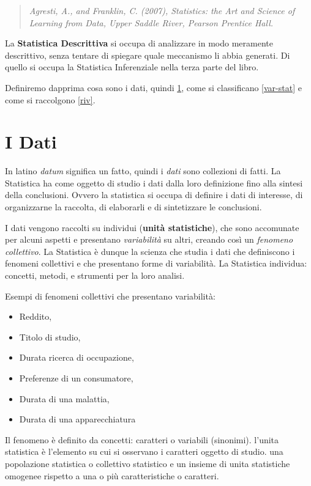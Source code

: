 \documentclass[
  11pt,
]{book}
\providecommand{\tightlist}{%
  \setlength{\itemsep}{0pt}\setlength{\parskip}{0pt}}
\theoremstyle{mytheoremstyle}
\theoremstyle{mydefstyle}
\begin{document}
\begin{quote}
\emph{Agresti, A., and Franklin, C. (2007), Statistics: the Art and Science of Learning from Data, Upper Saddle River, Pearson Prentice Hall.}
\end{quote}

La \textbf{Statistica Descrittiva} si occupa di analizzare in modo meramente descrittivo, senza tentare di spiegare quale meccanismo
li abbia generati. Di quello si occupa la Statistica Inferenziale nella terza parte del libro.

Definiremo dapprima cosa sono i dati, quindi \ref{dati}, come si classificano \ref{var-stat} e come si raccolgono \ref{riv}.

\section{I Dati}\label{dati}

In latino \emph{datum} significa un fatto, quindi i \emph{dati} sono collezioni di fatti.
La Statistica ha come oggetto di studio i dati dalla loro definizione fino alla sintesi della conclusioni.
Ovvero la statistica si occupa di definire i dati di interesse, di organizzarne la raccolta, di elaborarli e di sintetizzare le conclusioni.

I dati vengono raccolti su individui (\textbf{unità statistiche}), che sono accomunate per alcuni aspetti e presentano \emph{variabilità} su altri, creando così un \emph{fenomeno collettivo}.
La Statistica è dunque la scienza che studia i dati che definiscono i fenomeni collettivi e che presentano forme di variabilità.
La Statistica individua: concetti, metodi, e strumenti per la loro analisi.

Esempi di fenomeni collettivi che presentano variabilità:

\begin{itemize}
\tightlist
\item
  Reddito,
\item
  Titolo di studio,
\item
  Durata ricerca di occupazione,
\item
  Preferenze di un consumatore,
\item
  Durata di una malattia,
\item
  Durata di una apparecchiatura
\end{itemize}

Il fenomeno è definito da concetti: caratteri o variabili (sinonimi).
l'unita statistica è l'elemento su cui si osservano i caratteri oggetto di studio.
una popolazione statistica o collettivo statistico e un insieme di unita statistiche omogenee rispetto a una o più caratteristiche o caratteri.
\end{document}
